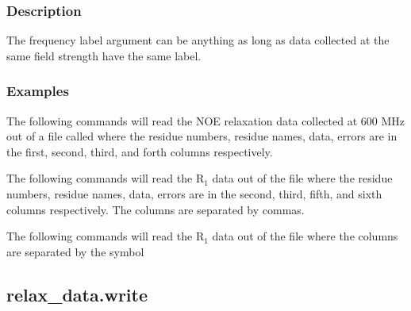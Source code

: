   

  
 \subsubsection{Description} 

 The frequency label argument can be anything as long as data collected at the same field strength have the same label. 
  

  
 \subsubsection{Examples} 

 The following commands will read the NOE relaxation data collected at 600 MHz out of a file called  where the residue numbers, residue names, data, errors are in the first, second, third, and forth columns respectively. 
  



 The following commands will read the R$_1$ data out of the file  where the residue numbers, residue names, data, errors are in the second, third, fifth, and sixth columns respectively.  The columns are separated by commas. 
  



 The following commands will read the R$_1$ data out of the file  where the columns are separated by the symbol \quotecmd{\%} 
  


  

 \newpage 

 \subsection{relax\_data.write} 

